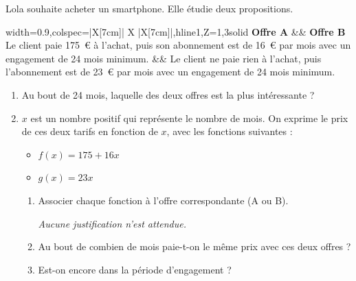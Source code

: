 \documentclass[exercice,a4]{thedocument}%
\begin{document}
%
\providecommand{\degres}{^\circ}%
Lola souhaite acheter un smartphone. Elle étudie deux propositions.

\begin{center}
	\begin{tblr}{width=0.9\linewidth,colspec={|X[7cm]| X |X[7cm]|},hline{1,Z}={1,3}{solid}}
		\textbf{Offre A} && \textbf{Offre B} \\
		Le client paie 175~\euro{} à l'achat, puis son abonnement est de 16~\euro{} par mois avec un engagement de 24 mois minimum. &&
		Le client ne paie rien à l'achat, puis l'abonnement est de 23~\euro{} par mois avec un engagement de 24 mois minimum.
	\end{tblr}
\end{center}

\begin{enumerate}
	\item Au bout de 24 mois, laquelle des deux offres est la plus intéressante ?
	\item $x$ est un nombre positif qui représente le nombre de mois. On exprime le prix de ces deux tarifs en fonction de $x$, avec les fonctions suivantes :

	\begin{itemize}
		\item $f(x) = 175 + 16x$
		\item $g(x) = 23x$
	\end{itemize}

	\begin{enumerate}[label={\textbf{\alph*.}}]
		\item Associer chaque fonction à l'offre correspondante (A ou B).

		\emph{Aucune justification n'est attendue.}
		\item Au bout de combien de mois paie-t-on le même prix avec ces deux offres ?
		\item Est-on encore dans la période d'engagement ?
	\end{enumerate}
\end{enumerate}

\newpage
\medskip
\showthesource
\end{document}
